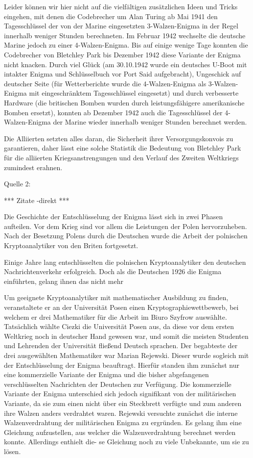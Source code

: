 Leider können wir hier nicht auf die vielfältigen zusätzlichen Ideen und Tricks eingehen,
mit denen die Codebrecher um Alan Turing ab Mai 1941 den Tagesschlüssel der von der Marine eingesetzten 3-Walzen-Enigma in der Regel innerhalb weniger Stunden berechneten. Im Februar 1942 wechselte die deutsche Marine jedoch zu einer 4-Walzen-Enigma. Bis auf einige wenige Tage konnten die Codebrecher von Bletchley Park bis Dezember 1942 diese Variante der Enigma nicht knacken. Durch viel Glück (am 30.10.1942 wurde ein deutsches U-Boot mit intakter Enigma und Schlüsselbuch vor Port Said aufgebracht), Ungeschick auf deutscher Seite (für Wetterberichte wurde die 4-Walzen-Enigma als 3-Walzen-Enigma mit eingeschränktem Tagesschlüssel eingesetzt) und durch verbesserte Hardware (die britischen Bomben wurden durch leistungsfähigere amerikanische Bomben ersetzt), konnten ab Dezember 1942 auch die Tagesschlüssel der 4-Walzen-Enigma der Marine wieder innerhalb weniger Stunden berechnet werden.

Die Alliierten setzten alles daran, die Sicherheit ihrer Versorgungskonvois zu garantieren, daher lässt eine solche Statistik die Bedeutung von Bletchley Park für die alliierten Kriegsanstrengungen und den Verlauf des Zweiten Weltkriegs zumindest erahnen.

Quelle 2:
\cite{oepen_hoefer_2007 }

*** Zitate -direkt ***

Die Geschichte der Entschlüsselung der Enigma lässt sich in zwei Phasen aufteilen. Vor dem Krieg sind vor allem die Leistungen der Polen hervorzuheben. Nach der Besetzung Polens durch die Deutschen wurde die Arbeit der polnischen Kryptoanalytiker von den Briten fortgesetzt.

Einige Jahre lang entschlüsselten die polnischen Kryptoanalytiker den deutschen Nachrichtenverkehr erfolgreich. Doch als die Deutschen 1926 die Enigma einführten, gelang ihnen das nicht mehr

Um geeignete Kryptoanalytiker mit mathematischer Ausbildung zu finden, veranstaltete er an der Universität Posen einen Kryptographiewettbewerb, bei welchem er drei Mathematiker für die Arbeit im Biuro Szyfrow auswählte. Tatsächlich wählte Ciezki die Universität Posen aus, da diese vor dem ersten Weltkrieg noch in deutscher Hand gewesen war, und somit die meisten Studenten und Lehrenden der Universität fließend Deutsch sprachen.
Der begabteste der drei ausgewählten Mathematiker war Marian Rejewski.
Dieser wurde sogleich mit der Entschlüsselung der Enigma beauftragt. Hierfür standen ihm zunächst nur eine kommerzielle Variante der Enigma und die bisher abgefangenen verschlüsselten Nachrichten der Deutschen zur Verfügung. Die kommerzielle Variante der Enigma unterschied sich jedoch signifikant von der militärischen Variante, da sie zum einen nicht über ein Steckbrett verfügte und zum anderen ihre Walzen anders verdrahtet waren. Rejewski versuchte zunächst die interne Walzenverdrahtung der militärischen Enigma zu ergründen. Es gelang ihm eine Gleichung aufzustellen, aus welcher die Walzenverdrahtung berechnet werden konnte. Allerdings enthielt die- se Gleichung noch zu viele Unbekannte, um sie zu lösen.

